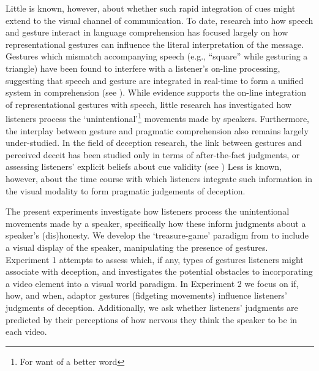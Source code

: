 \documentclass[a4paper,man,natbib]{apa6}
\begin{document}
Little is known, however, about whether such rapid integration of cues might extend to the visual channel of communication. %
To date, research into how speech and gesture interact in language comprehension has focused largely on how representational gestures can influence the literal interpretation of the message.
Gestures which mismatch accompanying speech (e.g., ``square'' while gesturing a triangle) have been found to interfere with a listener's on-line processing, suggesting that speech and gesture are integrated in real-time to form a unified system in comprehension (see \citealt{Kelly2010, Habets2013}).
While evidence supports the on-line integration of representational gestures with speech, little research has investigated how listeners process the `unintentional'\footnote{For want of a better word} movements made by speakers. %
Furthermore, the interplay between gesture and pragmatic comprehension also remains largely under-studied. %
In the field of deception research, the link between gestures and perceived deceit has been studied only in terms of after-the-fact judgments, or assessing listeners' explicit beliefs about cue validity (see \citealt{Vrij1996a, Zuckerman1981a}) %
Less is known, however, about the time course with which listeners integrate such information in the visual modality to form pragmatic judgements of deception.

The present experiments investigate how listeners process the unintentional movements made by a speaker, specifically how these inform judgments about a speaker's (dis)honesty.
We develop the `treasure-game’ paradigm from \citet{Loy2017} to include a visual display of the speaker, manipulating the presence of gestures.
Experiment 1 attempts to assess which, if any, types of gestures listeners might associate with deception, and investigates the potential obstacles to incorporating a video element into a visual world paradigm.
In Experiment 2 we focus on if, how, and when, adaptor gestures (fidgeting movements) influence listeners' judgments of deception.
Additionally, we ask whether listeners' judgments are predicted by their perceptions of how nervous they think the speaker to be in each video.
\end{document}
